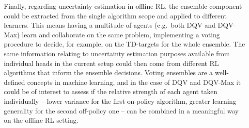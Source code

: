 Finally, regarding uncertainty estimation in offline RL, the ensemble
component could be extracted from the single algorithm scope and
applied to different learners. This means having a multitude of agents
(e.g.\ both DQV and DQV-Max) learn and collaborate on the same
problem, implementing a voting procedure to decide, for example, on
the TD-targets for the whole ensemble. The same information
relating to uncertainty estimation purposes available from individual
heads in the current setup could then come from different RL
algorithms that inform the ensemble decisions. Voting ensembles are a
well-defined concepts in machine learning, and in the case of DQV and
DQV-Max it could be of interest to assess if the relative strength of
each agent taken individually -- lower variance for the first
on-policy algorithm, greater learning generality for the second
off-policy one -- can be combined in a meaningful way on the offline
RL setting.
